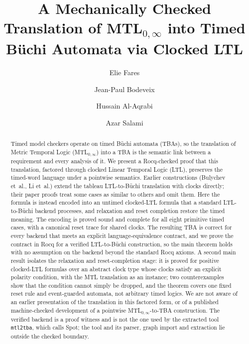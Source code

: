 \documentclass[manuscript]{acmart}
\begin{document}
\title{A Mechanically Checked Translation of MTL$_{0,\infty}$ into Timed B\"uchi Automata via Clocked LTL}

\author{Elie Fares}
\author{Jean-Paul Bodeveix}
\author{Hussain Al-Aqrabi}
\author{Azar Salami}

\begin{abstract}
Timed model checkers operate on timed B\"uchi automata (TBAs), so the translation
of Metric Temporal Logic (MTL$_{0,\infty}$) into a TBA is the semantic link
between a requirement and every analysis of it. We present a Rocq-checked proof
that this translation, factored through clocked Linear Temporal Logic (LTL),
preserves the timed-word language under a pointwise semantics. Earlier constructions (Bulychev et~al.,
Li et~al.) extend the tableau LTL-to-B\"uchi translation with clocks directly;
their paper proofs treat some cases as similar to others and omit them. Here the
formula is instead encoded into an untimed clocked-LTL formula that a standard
LTL-to-B\"uchi backend processes, and relaxation and reset completion restore
the timed meaning. The encoding is proved sound and complete for all eight
primitive timed cases, with a canonical reset trace for shared clocks. The
resulting TBA is correct for every backend that meets an explicit
language-equivalence contract, and we prove the contract in Rocq for a
verified LTL-to-B\"uchi construction, so the main theorem holds with no assumption on the
backend beyond the standard Rocq axioms. A second main result isolates the
relaxation and reset-completion stage: it is proved for positive clocked-LTL
formulas over an abstract clock type whose clocks satisfy an explicit polarity
condition, with the MTL translation as an instance; two counterexamples show that
the condition cannot simply be dropped, and the theorem covers one fixed reset
rule and event-guarded automata, not arbitrary timed logics. We are not aware of
an earlier presentation of the translation in this factored form, or of a
published machine-checked development of a pointwise MTL$_{0,\infty}$-to-TBA
construction. The verified backend is a proof witness and is not
the one used by the extracted tool \texttt{mtl2tba}, which calls Spot; the tool
and its parser, graph import and extraction lie outside the checked boundary.
\end{abstract}
\end{document}
